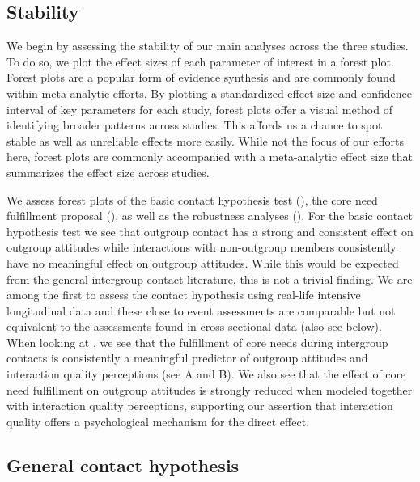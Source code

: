 \subsection{Stability}

We begin by assessing the stability of our main analyses across the
three studies. To do so, we plot the effect sizes of each parameter of
interest in a forest plot. Forest plots are a popular form of evidence
synthesis and are commonly found within meta-analytic efforts. By
plotting a standardized effect size and confidence interval of key
parameters for each study, forest plots offer a visual method of
identifying broader patterns across studies. This affords us a chance to
spot stable as well as unreliable effects more easily. While not the
focus of our efforts here, forest plots are commonly accompanied with a
meta-analytic effect size that summarizes the effect size across
studies.

We assess forest plots of the basic contact hypothesis test
(), the core need fulfillment proposal
(), as well as the robustness
analyses (). For the basic contact hypothesis
test we see that outgroup contact has a strong and consistent effect on
outgroup attitudes while interactions with non-outgroup members
consistently have no meaningful effect on outgroup attitudes. While this
would be expected from the general intergroup contact literature, this
is not a trivial finding. We are among the first to assess the contact
hypothesis using real-life intensive longitudinal data and these close
to event assessments are comparable but not equivalent to the
assessments found in cross-sectional data (also see below). When looking
at , we see that the fulfillment of
core needs during intergroup contacts is consistently a meaningful
predictor of outgroup attitudes and interaction quality perceptions (see
 A and B). We also see that the
effect of core need fulfillment on outgroup attitudes is strongly
reduced when modeled together with interaction quality perceptions,
supporting our assertion that interaction quality offers a psychological
mechanism for the direct effect.

\subsection{General contact hypothesis}

